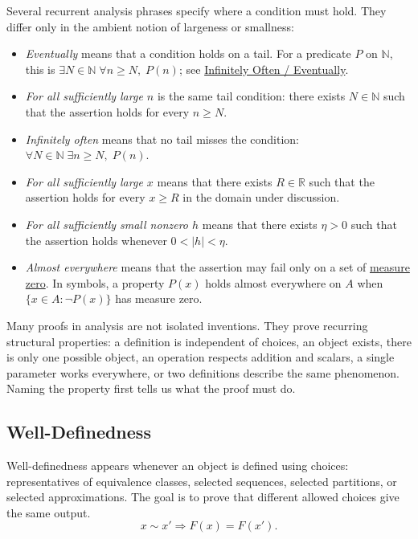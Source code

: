 \begin{remark*}
Several recurrent analysis phrases specify where a condition must hold.
They differ only in the ambient notion of largeness or smallness:
\begin{itemize}
  \item \emph{Eventually} means that a condition holds on a tail. For a
        predicate $P$ on $\mathbb{N}$, this is
        $\exists N\in\mathbb{N}\;\forall n\geq N,\;P(n)$; see
        \hyperref[def:inf-often-eventually]{Infinitely Often / Eventually}.
  \item \emph{For all sufficiently large $n$} is the same tail condition:
        there exists $N\in\mathbb{N}$ such that the assertion holds for every
        $n\geq N$.
  \item \emph{Infinitely often} means that no tail misses the condition:
        $\forall N\in\mathbb{N}\;\exists n\geq N,\;P(n)$.
  \item \emph{For all sufficiently large $x$} means that there exists
        $R\in\mathbb{R}$ such that the assertion holds for every $x\geq R$ in
        the domain under discussion.
  \item \emph{For all sufficiently small nonzero $h$} means that there exists
        $\eta>0$ such that the assertion holds whenever
        $0<|h|<\eta$.
  \item \emph{Almost everywhere} means that the assertion may fail only on a
        set of \hyperref[def:measure-zero]{measure zero}. In symbols, a
        property $P(x)$ holds almost everywhere on $A$ when
        $\{x\in A:\neg P(x)\}$ has measure zero.
\end{itemize}
\end{remark*}

Many proofs in analysis are not isolated inventions. They prove recurring
structural properties: a definition is independent of choices, an object
exists, there is only one possible object, an operation respects addition and
scalars, a single parameter works everywhere, or two definitions describe the
same phenomenon. Naming the property first tells us what the proof must do.

\subsection*{Well-Definedness}
\label{subsec:property-well-definedness}

Well-definedness appears whenever an object is defined using choices:
representatives of equivalence classes, selected sequences, selected
partitions, or selected approximations. The goal is to prove that different
allowed choices give the same output.
\[
  x\sim x' \Longrightarrow F(x)=F(x').
\]

